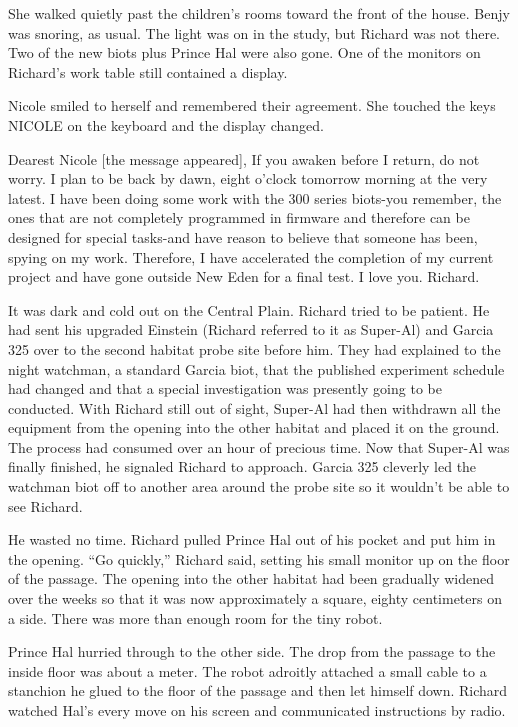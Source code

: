 \documentclass[]{article}
\begin{document}
{She walked quietly past the children’s rooms toward the front of the house. Benjy was snoring, as usual. The light was on in the study, but Richard was not there. Two of the new biots plus Prince Hal were also gone. One of the monitors on Richard’s work table still contained a display.

Nicole smiled to herself and remembered their agreement. She touched the keys NICOLE on the keyboard and the display changed.

Dearest Nicole [the message appeared], If you awaken before I return, do not worry. I plan to be back by dawn, eight o’clock tomorrow morning at the very latest. I have been doing some work with the 300 series biots-you remember, the ones that are not completely programmed in firmware and therefore can be designed for special tasks-and have reason to believe that someone has been, spying on my work. Therefore, I have accelerated the completion of my current project and have gone outside New Eden for a final test. I love you. Richard.

It was dark and cold out on the Central Plain. Richard tried to be patient. He had sent his upgraded Einstein (Richard referred to it as Super-Al) and Garcia 325 over to the second habitat probe site before him. They had explained to the night watchman, a standard Garcia biot, that the published experiment schedule had changed and that a special investigation was presently going to be conducted. With Richard still out of sight, Super-Al had then withdrawn all the equipment from the opening into the other habitat and placed it on the ground. The process had consumed over an hour of precious time. Now that Super-Al was finally finished, he signaled Richard to approach. Garcia 325 cleverly led the watchman biot off to another area around the probe site so it wouldn’t be able to see Richard.

He wasted no time. Richard pulled Prince Hal out of his pocket and put him in the opening. “Go quickly,” Richard said, setting his small monitor up on the floor of the passage. The opening into the other habitat had been gradually widened over the weeks so that it was now approximately a square, eighty centimeters on a side. There was more than enough room for the tiny robot.

Prince Hal hurried through to the other side. The drop from the passage to the inside floor was about a meter. The robot adroitly attached a small cable to a stanchion he glued to the floor of the passage and then let himself down. Richard watched Hal’s every move on his screen and communicated instructions by radio.

}
\end{document}

